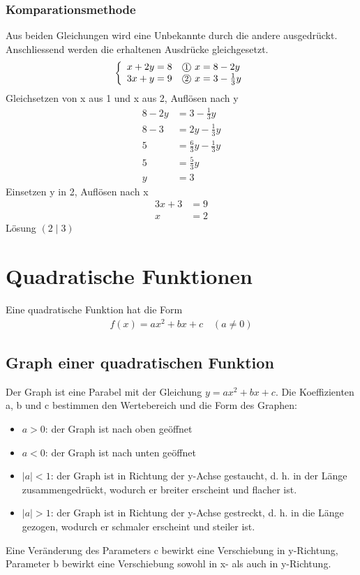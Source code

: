 \documentclass[a4paper]{article}
\begin{document}
\subsubsection{Komparationsmethode}
Aus beiden Gleichungen wird eine Unbekannte durch die andere ausgedrückt. Anschliessend werden die erhaltenen Ausdrücke gleichgesetzt.
\[
\left\{
\begin{array}{ll}
x+2y=8 & \text{\textcircled{\footnotesize{1}} } x=8-2y\\
3x+y=9 & \text{\textcircled{\footnotesize{2}} } x=3-\frac{1}{3}y
\end{array}
\right.
\]
Gleichsetzen von x aus \textcircled{\footnotesize{1}} und x aus \textcircled{\footnotesize{2}}, Auflösen nach y
\begin{align*}
8-2y&=3-\frac{1}{3}y \\
8-3&=2y-\frac{1}{3}y \\
5&=\frac{6}{3}y-\frac{1}{3}y \\
5&=\frac{5}{3}y \\
y&=3
\end{align*}
Einsetzen y in \textcircled{\footnotesize{2}}, Auflösen nach x
\begin{align*}
3x+3&=9 \\
x&=2
\end{align*}
Lösung $(2\mid 3)$

\section{Quadratische Funktionen}
Eine quadratische Funktion hat die Form
\begin{align*}
f(x)=ax^{2}+bx+c \quad(a \neq 0)
\end{align*}
\subsection{Graph einer quadratischen Funktion}
Der Graph ist eine Parabel mit der Gleichung $y=ax^{2}+bx+c$. Die Koeffizienten a, b und c bestimmen den Wertebereich und die Form des Graphen:
\begin{itemize}
\item $a>0$: der Graph ist nach oben geöffnet
\item $a<0$: der Graph ist nach unten geöffnet
\item $|a| < 1$: der Graph ist in Richtung der y-Achse gestaucht, d. h. in der Länge zusammengedrückt, wodurch er breiter erscheint und flacher ist.
\item $|a| > 1$: der Graph ist in Richtung der y-Achse gestreckt, d. h. in die Länge gezogen, wodurch er schmaler erscheint und steiler ist. 
\end{itemize}
Eine Veränderung des Parameters c bewirkt eine Verschiebung in y-Richtung, Parameter b bewirkt eine Verschiebung sowohl in x- als auch in y-Richtung.
\end{document}
